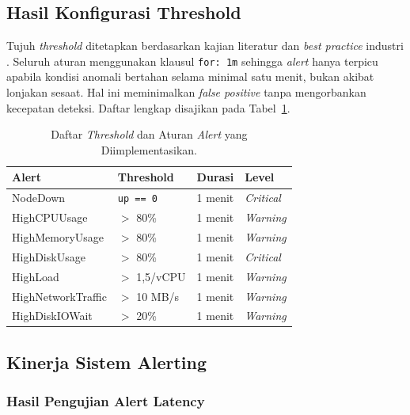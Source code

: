 \documentclass[10pt,twocolumn]{article}
\begin{document}
\subsection{Hasil Konfigurasi Threshold}

Tujuh \textit{threshold} ditetapkan berdasarkan kajian literatur dan \textit{best practice} industri
\cite{turnbull2018,pivotto2023}. Seluruh aturan menggunakan klausul \texttt{for: 1m} sehingga
\textit{alert} hanya terpicu apabila kondisi anomali bertahan selama minimal satu menit, bukan akibat
lonjakan sesaat. Hal ini meminimalkan \textit{false positive} tanpa mengorbankan kecepatan deteksi.
Daftar lengkap disajikan pada Tabel~\ref{tab:threshold}.

\begin{table}[H]
  \centering
  \caption{Daftar \textit{Threshold} dan Aturan \textit{Alert} yang Diimplementasikan.}
  \label{tab:threshold}
  \begin{tabularx}{\linewidth}{lXXX}
    \toprule
    \textbf{Alert} & \textbf{Threshold} & \textbf{Durasi} & \textbf{Level} \\
    \midrule
    NodeDown            & \texttt{up == 0}  & 1 menit & \textit{Critical} \\
    HighCPUUsage        & $>$ 80\%          & 1 menit & \textit{Warning}  \\
    HighMemoryUsage     & $>$ 80\%          & 1 menit & \textit{Warning}  \\
    HighDiskUsage       & $>$ 80\%          & 1 menit & \textit{Critical} \\
    HighLoad            & $>$ 1,5/vCPU      & 1 menit & \textit{Warning}  \\
    HighNetworkTraffic  & $>$ 10 MB/s       & 1 menit & \textit{Warning}  \\
    HighDiskIOWait      & $>$ 20\%          & 1 menit & \textit{Warning}  \\
    \bottomrule
  \end{tabularx}
\end{table}

\subsection{Kinerja Sistem Alerting}

\subsubsection{Hasil Pengujian Alert Latency}
\end{document}
